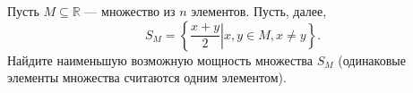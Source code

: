 \documentclass{article}
\begin{document}
Пусть $M \subseteq \mathbb{R}$ --- множество из $n$ элементов. Пусть, далее,
$$S_M = \left\{ \left. \frac{x+y}{2} \right| x,y \in M, x \neq y \right\}.$$
Найдите наименьшую возможную мощность множества $S_M$ (одинаковые элементы множества считаются одним элементом).
\end{document}

